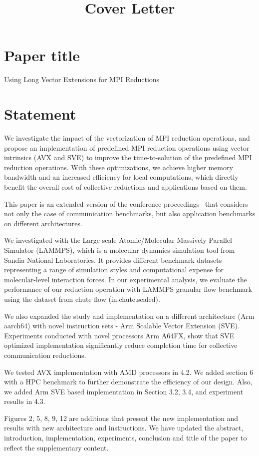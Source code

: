 \documentclass[1p,times]{elsarticle}
\begin{document}
\title{Cover Letter}

\section*{Paper title}
Using Long Vector Extensions for MPI Reductions

\section*{Statement}

We investigate the impact of the vectorization of MPI reduction
operations, and propose an implementation of predefined MPI reduction
operations using vector intrinsics (AVX and SVE) to improve the
time-to-solution of the predefined MPI reduction operations.
With these optimizations, we achieve higher memory bandwidth and an increased
efficiency for local computations, which directly benefit the overall cost of
collective reductions and applications based on them.

This paper is an extended version of the conference proceedings~\cite{avxeurpmpi2020}
that considers not only the case of communication benchmarks, but also application benchmarks on different architectures.

We investigated with the Large-scale Atomic/Molecular Massively Parallel Simulator (LAMMPS), which is a
molecular dynamics simulation tool from Sandia National Laboratories.
It provides different benchmark datasets representing a range of simulation styles
and computational expense for molecular-level interaction forces.
In our experimental analysis, we evaluate the performance of our reduction
operation with LAMMPS granular flow benchmark using the dataset from chute flow (in.chute.scaled).

We also expanded the study and implementation on a different architecture (Arm aarch64)
with novel instruction sets - Arm Scalable Vector Extension (SVE).
Experiments conducted with novel processors Arm A64FX, show that SVE optimized implementation
significantly reduce completion time for collective communication reductions.

We tested AVX implementation with AMD processors in 4.2. We added section 6 with a
HPC benchmark to further demonstrate the efficiency of our design.
Also, we added Arm SVE based implementation in Section 3.2, 3.4, and experiment results in 4.3.

Figures 2, 5, 8, 9, 12 are additions that present the new implementation and
results with new architecture and instructions. We have updated the abstract, introduction, implementation, experiments,
conclusion and title of the paper to reflect the supplementary content.



\end{document}
